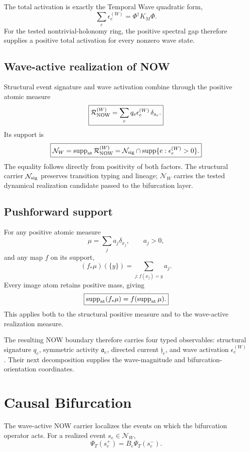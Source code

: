 The total activation is exactly the Temporal Wave quadratic form,
\[
\boxed{
\sum_e\epsilon_e^{(W)}
=\Phi^\dagger K_M\Phi.
}
\]
For the tested nontrivial-holonomy ring, the positive spectral gap therefore supplies a positive total activation for every nonzero wave state.

\section{Wave-active realization of NOW}

Structural event signature and wave activation combine through the positive atomic measure
\[
\boxed{
\mathcal R_{\rm NOW}^{(W)}
=\sum_e q_e\epsilon_e^{(W)}\,\delta_{s_e}.
}
\]
Its support is
\[
\boxed{
\mathcal N_W
=\operatorname{supp}_{\rm at}\mathcal R_{\rm NOW}^{(W)}
=\mathcal N_{\rm sig}
\cap
\operatorname{supp}\{e:\epsilon_e^{(W)}>0\}.
}
\]
The equality follows directly from positivity of both factors.  The structural carrier $\mathcal N_{\rm sig}$ preserves transition typing and lineage; $\mathcal N_W$ carries the tested dynamical realization candidate passed to the bifurcation layer.

\section{Pushforward support}

For any positive atomic measure
\[
\mu=\sum_j a_j\delta_{x_j},
\qquad a_j>0,
\]
and any map $f$ on its support,
\[
(f_*\mu)(\{y\})
=\sum_{j:f(x_j)=y}a_j.
\]
Every image atom retains positive mass, giving
\[
\boxed{
\operatorname{supp}_{\rm at}(f_*\mu)
=f(\operatorname{supp}_{\rm at}\mu).
}
\]
This applies both to the structural positive measure and to the wave-active realization measure.

The resulting NOW boundary therefore carries four typed observables: structural signature $q_e$, symmetric activity $\mathfrak a_e$, directed current $\mathfrak j_e$, and wave activation $\epsilon_e^{(W)}$.  Their next decomposition supplies the wave-magnitude and bifurcation-orientation coordinates.


\chapter{Causal Bifurcation}

The wave-active NOW carrier localizes the events on which the bifurcation operator acts.  For a realized event $s_e\in\mathcal N_W$,
\[
\Psi_T(s_e^+)=B_e\Psi_T(s_e^-).
\]

